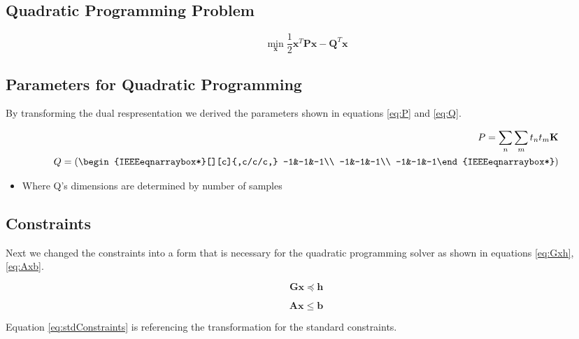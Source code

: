 \documentclass[journal]{IEEEtran}
\begin{document}
    \subsection{Quadratic Programming Problem \cite{QuadraticCVXOPT}}
    \begin{equation}
    \label{eq:quad}
    \min_{\mathbf{x}} \frac{1}{2}\mathbf{x}^T\mathbf{P}\mathbf{x} - \mathbf{Q}^T\mathbf{x}
    \end{equation}

    \subsection{Parameters for Quadratic Programming}

    By transforming the dual respresentation we derived the parameters shown in equations \ref{eq:P} and \ref{eq:Q}.

    \begin{eqnarray}
    \label{eq:P}
    P = \sum\limits_{n} \sum\limits_{m} t_n t_m \mathbf{K}\\
    \label{eq:Q}
    Q = \left(\begin{IEEEeqnarraybox*}[][c]{,c/c/c,}
    -1&-1&-1\\
    -1&-1&-1\\
    -1&-1&-1%
    \end{IEEEeqnarraybox*}\right)
    \end{eqnarray}
    \begin{itemize}
    \item Where Q's dimensions are determined by number of samples
    \end{itemize}

    \subsection{Constraints}

    Next we changed the constraints into a form that is necessary for the quadratic programming solver as shown in equations \ref{eq:Gxh}, \ref{eq:Axb}.

    \begin{equation}
    \label{eq:Gxh}
    \mathbf{G} \mathbf{x} \preceq \mathbf{h}
    \end{equation}

    \begin{equation}
    \label{eq:Axb}
    \mathbf{A} \mathbf{x} \leq \mathbf{b}
    \end{equation}

    Equation \ref{eq:stdConstraints} is referencing the transformation for the standard constraints.
\end{document}
